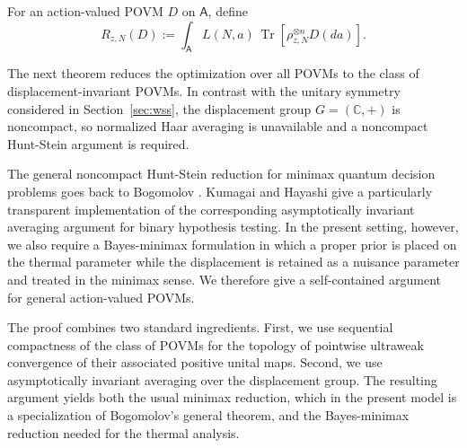 \documentclass{article}
\theoremstyle{named}
\theoremstyle{named1}
\newcommand{\Tr}{\operatorname{Tr}}
\newcommand{\bbC}{\mathbb C}
\theoremstyle{plain}
\theoremstyle{remark}
\begin{document}
For an action-valued POVM \(D\) on \(\mathsf A\), define
\begin{equation}
    R_{z,N}(D)
    :=
    \int_{\mathsf A}
        L(N,a)\,
        \Tr\!\left[
            \rho_{z,N}^{\otimes n}D(da)
        \right].
    \label{eq:risk}
\end{equation}

The next theorem reduces the optimization over all POVMs to the class of
displacement-invariant POVMs. In contrast with the unitary symmetry
considered in Section~\ref{sec:wss}, the displacement group
$G=(\bbC,+)$ is noncompact, so normalized Haar averaging is unavailable
and a noncompact Hunt-Stein argument is required.

The general noncompact Hunt-Stein reduction for minimax quantum
decision problems goes back to Bogomolov
\cite{bogomolov1982minimax}.  Kumagai and Hayashi
\cite{KumagaiHayashi2013} give a particularly transparent implementation
of the corresponding asymptotically invariant averaging argument for
binary hypothesis testing.  In the present setting, however, we also
require a Bayes-minimax formulation in which a proper prior is placed on
the thermal parameter while the displacement is retained as a nuisance
parameter and treated in the minimax sense.  We therefore give a
self-contained argument for general action-valued POVMs.

The proof combines two standard ingredients. First, we use sequential
compactness of the class of POVMs for the topology of pointwise ultraweak
convergence of their associated positive unital maps. Second, we use
asymptotically invariant averaging over the displacement group. The
resulting argument yields both the usual minimax reduction, which in the
present model is a specialization of Bogomolov's general theorem, and the
Bayes-minimax reduction needed for the thermal analysis.
\end{document}
